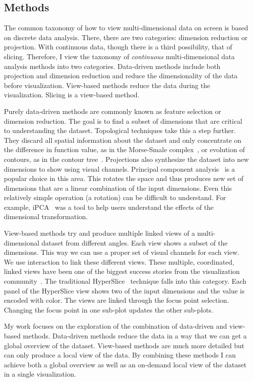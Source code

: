 \subsection{Methods}

The common taxonomy of how to view multi-dimensional data on screen is based on
discrete data analysis. There, there are two categories: dimension reduction or
projection. With continuous data, though there is a third possibility, that of
slicing. Therefore, I view the taxonomy of \emph{continuous} multi-dimensional
data analysis methods into two categories. Data-driven methods include both
projection and dimension reduction and reduce the dimensionality of the data
before visualization. View-based methods reduce the data during the
visualization. Slicing is a view-based method.

Purely data-driven methods are commonly known as feature selection or dimension
reduction. The goal is to find a subset of dimensions that are critical to
understanding the dataset. Topological techniques take this a step further.
They discard all spatial information about the dataset and only concentrate on
the difference in function value, as in the Morse-Smale
complex~\cite{Gyulassy:2012a}, or evolution of contours, as in the contour
tree~\cite{Carr:2003a}.  Projections also synthesize the dataset into new
dimensions to show using visual channels. Principal component
analysis~\cite{Holbrey:2006} is a popular choice in this area. This rotates the
space and thus produces new set of dimensions that are a linear combination of
the input dimensions. Even this relatively simple operation (a rotation) can be
difficult to understand. For example, iPCA~\cite{Jeong:2009a} was a tool to
help users understand the effects of the dimensional transformation.

View-based methods try and produce multiple linked views of a multi-dimensional
dataset from different angles. Each view shows a subset of the dimensions.
This way we can use a proper set of visual channels for each view.  We use
interaction to link these different views. These multiple, coordinated, linked
views have been one of the biggest success stories from the visualization
community~\cite{Rao:1994}. The traditional HyperSlice~\cite{Wijk:1993}
technique falls into this category. Each panel of the HyperSlice view shows two
of the input dimensions and the value is encoded with color.
The views are linked through the focus point selection. Changing the focus point
in one sub-plot updates the other sub-plots.

My work focuses on the exploration of the combination of data-driven and
view-based methods.  Data-driven methods reduce the data in a way that we can
get a global overview of the dataset. View-based methods are much more detailed
but can only produce a local view of the data. By combining these methods I can
achieve both a global overview as well as an on-demand local view of the
dataset in a single visualization. 

